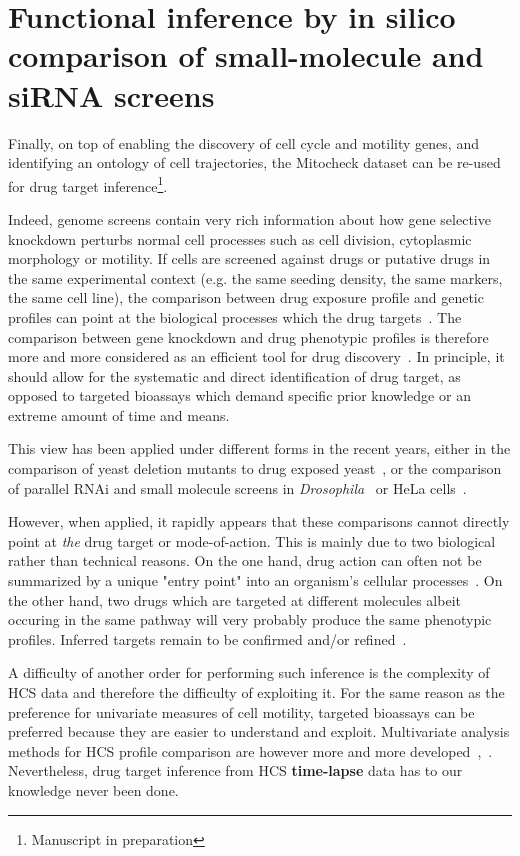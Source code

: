 \section{Functional inference by in silico comparison of small-molecule and siRNA screens}
\label{target_inference}
Finally, on top of enabling the discovery of cell cycle and motility genes, and identifying an ontology of cell trajectories, the Mitocheck dataset can be re-used for drug target inference\footnote{Manuscript in preparation}.

Indeed, genome screens contain very rich information about how gene selective knockdown perturbs normal cell processes such as cell division, cytoplasmic morphology or motility. If cells are screened against drugs or putative drugs in the same experimental context (e.g. the same seeding density, the same markers, the same cell line), the comparison between drug exposure profile and genetic profiles can point at the biological processes which the drug targets~\cite{pmid16901791}. The comparison between gene knockdown and drug phenotypic profiles is therefore more and more considered as an efficient tool for drug discovery~\cite{pmid19568283}. In principle, it should allow for the systematic and direct identification of drug target, as opposed to targeted bioassays which demand specific prior knowledge or an extreme amount of time and means.

This view has been applied under different forms in the recent years, either in the comparison of yeast deletion mutants to drug exposed yeast~\cite{pmid20418956}, or the comparison of parallel RNAi and small molecule screens in \textit{Drosophila}~\cite{pmid16901791} or HeLa cells~\cite{pmid18066055}.

However, when applied, it rapidly appears that these comparisons cannot directly point at \textit{the} drug target or mode-of-action. This is mainly due to two biological rather than technical reasons. On the one hand, drug action can often not be summarized by a unique "entry point" into an organism's cellular processes~\cite{pmid26272035}. On the other hand, two drugs which are targeted at different molecules albeit occuring in the same pathway will very probably produce the same phenotypic profiles. Inferred targets remain to be confirmed and/or refined~\cite{pmid23508189}.

A difficulty of another order for performing such inference is the complexity of HCS data and therefore the difficulty of exploiting it. For the same reason as the preference for univariate measures of cell motility, targeted bioassays can be preferred because they are easier to understand and exploit. Multivariate analysis methods for HCS profile comparison are however more and more developed~\cite{pmid17401369},~\cite{pmid18066055}. Nevertheless, drug target inference from HCS \textbf{time-lapse} data has to our knowledge never been done.

